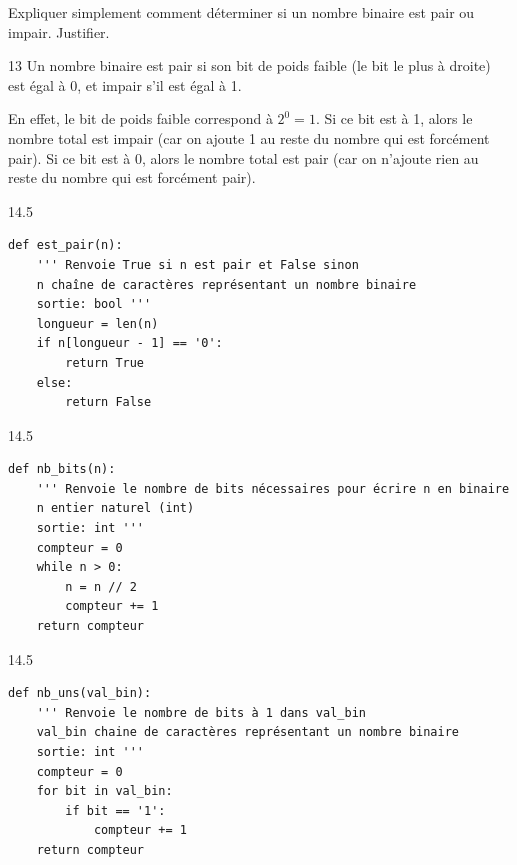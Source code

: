 \documentclass[a4paper,10pt]{report}
\def\ptsexoG{2}
\def\ptsexoH{1}
\def\ptsexoI{2}
\def\ptsexoJ{2}
\begin{document}
\exods{\ptsexoG}

Expliquer simplement comment déterminer si un nombre binaire est pair ou impair. Justifier.

    \begin{answer}{1}{3}   
    Un nombre binaire est pair si son bit de poids faible (le bit le plus à droite) est égal à 0, et impair s'il est égal à 1.

    En effet, le bit de poids faible correspond à $2^0 = 1$. Si ce bit est à 1, alors le nombre total est impair (car on ajoute 1 au reste du nombre qui est forcément pair). Si ce bit est à 0, alors le nombre total est pair (car on n'ajoute rien au reste du nombre qui est forcément pair).
    \end{answer}




\medskip

\pagebreak

\exods{\ptsexoH}

    \begin{answer}{1}{4.5} 
\begin{verbatim}
def est_pair(n):
    ''' Renvoie True si n est pair et False sinon
    n chaîne de caractères représentant un nombre binaire
    sortie: bool '''
    longueur = len(n)
    if n[longueur - 1] == '0':
        return True
    else:
        return False
    \end{verbatim}

    \end{answer}

\medskip

\exods{\ptsexoI}

   \begin{answer}{1}{4.5} 
\begin{verbatim}
def nb_bits(n):
    ''' Renvoie le nombre de bits nécessaires pour écrire n en binaire 
    n entier naturel (int)
    sortie: int '''
    compteur = 0
    while n > 0:
        n = n // 2
        compteur += 1
    return compteur
    \end{verbatim}

    \end{answer}


    \exods{\ptsexoJ}


    \begin{answer}{1}{4.5}
\begin{verbatim}
def nb_uns(val_bin):
    ''' Renvoie le nombre de bits à 1 dans val_bin
    val_bin chaine de caractères représentant un nombre binaire
    sortie: int '''
    compteur = 0
    for bit in val_bin:
        if bit == '1':
            compteur += 1   
    return compteur
    \end{verbatim}

    \end{answer}
\end{document}
